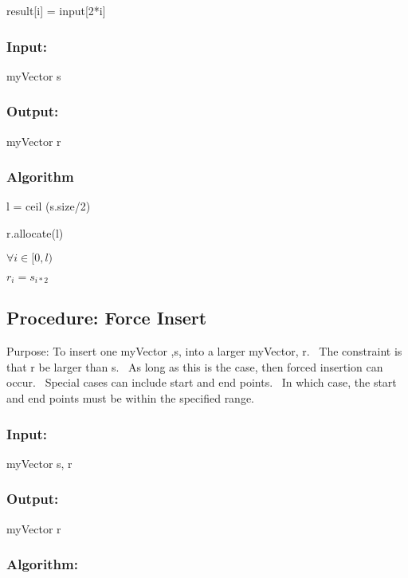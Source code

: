 \qquad result[i] = input[2*i]

\subsubsection{Input:}

\qquad myVector s

\subsubsection{Output:}

\qquad myVector r

\subsubsection{Algorithm}

\qquad l = ceil (s.size/2)

\qquad r.allocate(l)

\qquad $\forall i\in \lbrack 0,l)$

\qquad \qquad $r_{i}=s_{i\ast 2}$

\bigskip

\bigskip

\subsection{Procedure: Force Insert}

\bigskip Purpose: To insert one myVector ,s, into a larger myVector, r. \
The constraint is that r be larger than s. \ As long as this is the case,
then forced insertion can occur. \ Special cases can include start and end
points. \ In which case, the start and end points must be within the
specified range.

\subsubsection{Input:}

\qquad myVector s, r

\subsubsection{Output:}

\qquad myVector r

\subsubsection{Algorithm:}

